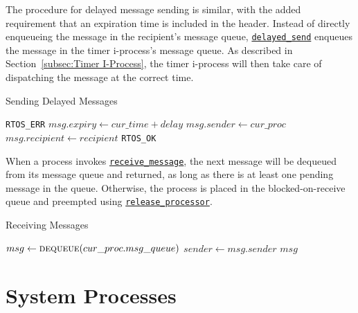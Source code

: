 \documentclass[12pt]{report}
\begin{document}
The procedure for delayed message sending is similar, with the added requirement that an expiration time is included in the header. Instead of directly enqueueing the message in the recipient's message queue, \hyperref[alg:sendingdelayedmessages]{\texttt{delayed_send}} enqueues the message in the timer i-process's message queue. As described in Section~\ref{subsec:Timer I-Process}, the timer i-process will then take care of dispatching the message at the correct time.\\

\begin{algorithm}
\caption{Sending Delayed Messages}
\label{alg:sendingdelayedmessages}
\begin{algorithmic}[1]
        \State \Return \texttt{RTOS_ERR}
    \EndIf
    \State $msg.expiry \leftarrow cur\_time + delay$
    \State $msg.sender \leftarrow cur\_proc$
    \State $msg.recipient \leftarrow recipient$
    \State {}
    \State \Return \texttt{RTOS_OK}
\EndProcedure
\end{algorithmic}
\end{algorithm}

When a process invokes \hyperref[alg:receivingmessages]{\texttt{receive_message}}, the next message will be dequeued from its message queue and returned, as long as there is at least one pending message in the queue. Otherwise, the process is placed in the blocked-on-receive queue and preempted using \hyperref[alg:releasingtheprocessor]{\texttt{release_processor}}.\\

\begin{algorithm}
\caption{Receiving Messages}
\label{alg:receivingmessages}
\begin{algorithmic}[1]
        \State {}
        \State {}
    \EndWhile
    \State $msg \leftarrow \Call{dequeue}{cur\_proc.msg\_queue}$
    \State $sender \leftarrow msg.sender$
    \State \Return $msg$
\EndProcedure
\end{algorithmic}
\end{algorithm}

\section{System Processes}
\end{document}
